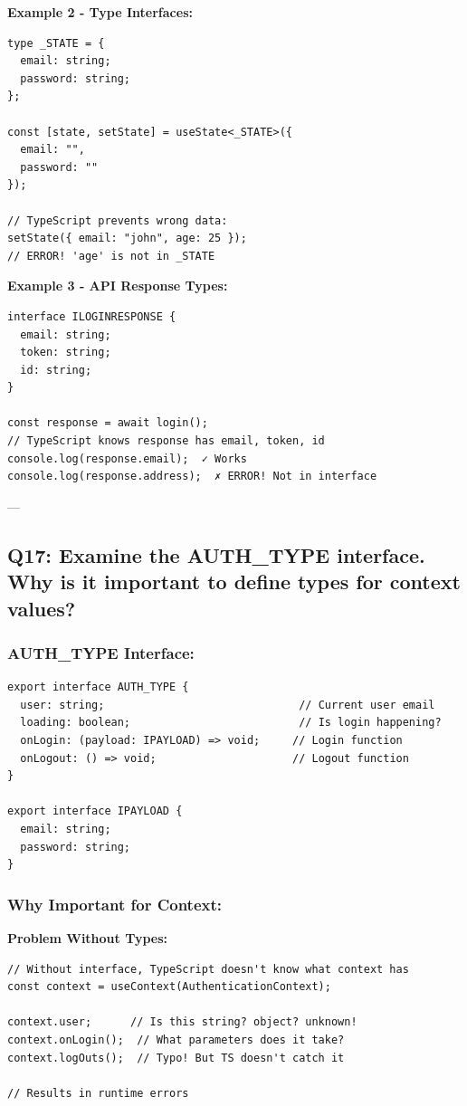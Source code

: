 \documentclass[12pt]{article}
\begin{document}
\textbf{Example 2 - Type Interfaces:}

\begin{lstlisting}
type _STATE = {
  email: string;
  password: string;
};

const [state, setState] = useState<_STATE>({
  email: "",
  password: ""
});

// TypeScript prevents wrong data:
setState({ email: "john", age: 25 });  
// ERROR! 'age' is not in _STATE
\end{lstlisting}

\textbf{Example 3 - API Response Types:}

\begin{lstlisting}
interface ILOGINRESPONSE {
  email: string;
  token: string;
  id: string;
}

const response = await login();
// TypeScript knows response has email, token, id
console.log(response.email);  ✓ Works
console.log(response.address);  ✗ ERROR! Not in interface
\end{lstlisting}

---

\subsection{Q17: Examine the AUTH\_TYPE interface. Why is it important to define types for context values?}

\subsubsection*{AUTH\_TYPE Interface:}

\begin{lstlisting}
export interface AUTH_TYPE {
  user: string;                              // Current user email
  loading: boolean;                          // Is login happening?
  onLogin: (payload: IPAYLOAD) => void;     // Login function
  onLogout: () => void;                     // Logout function
}

export interface IPAYLOAD {
  email: string;
  password: string;
}
\end{lstlisting}

\subsubsection*{Why Important for Context:}

\textbf{Problem Without Types:}

\begin{lstlisting}
// Without interface, TypeScript doesn't know what context has
const context = useContext(AuthenticationContext);

context.user;      // Is this string? object? unknown!
context.onLogin();  // What parameters does it take?
context.logOuts();  // Typo! But TS doesn't catch it

// Results in runtime errors
\end{lstlisting}
\end{document}
